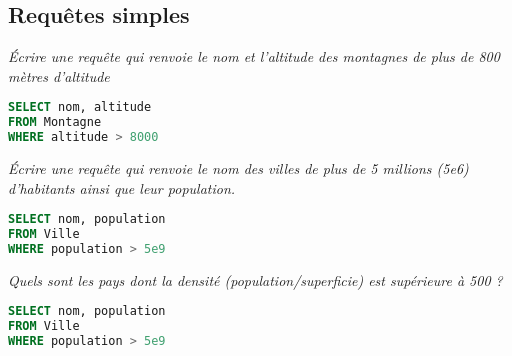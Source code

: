 \subsection{Requêtes simples} 
\begin{Exercise}
\it Écrire une requête qui renvoie le nom et l'altitude des montagnes de plus de 800 mètres d'altitude
\end{Exercise}
\begin{Answer}
\begin{lstlisting}[language=SQL]
SELECT nom, altitude
FROM Montagne
WHERE altitude > 8000
\end{lstlisting}
\end{Answer}
\begin{Exercise}
\it Écrire une requête qui renvoie le nom des villes de plus de 5 millions (5e6) d'habitants ainsi que leur population.
\end{Exercise}
\begin{Answer}
\begin{lstlisting}[language=SQL]
SELECT nom, population
FROM Ville
WHERE population > 5e9
\end{lstlisting}
\end{Answer}
\begin{Exercise}
\it Quels sont les pays dont la densité (population/superficie) est supérieure à 500 ?
\end{Exercise}
\begin{Answer}
\begin{lstlisting}[language=SQL]
SELECT nom, population
FROM Ville
WHERE population > 5e9
\end{lstlisting}
\end{Answer}
